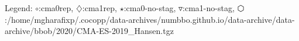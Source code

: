 Legend: {\color{NavyBlue}$\circ$}:cma0rep, {\color{Magenta}$\diamondsuit$}:cma1rep, {\color{Orange}$\star$}:cma0-no-stag, {\color{CornflowerBlue}$\triangledown$}:cma1-no-stag, {\color{red}$\varhexagon$}:/home/mgharafixp/.cocopp/data-archives/numbbo.github.io/data-archive/data-archive/bbob/2020/CMA-ES-2019\_Hansen.tgz